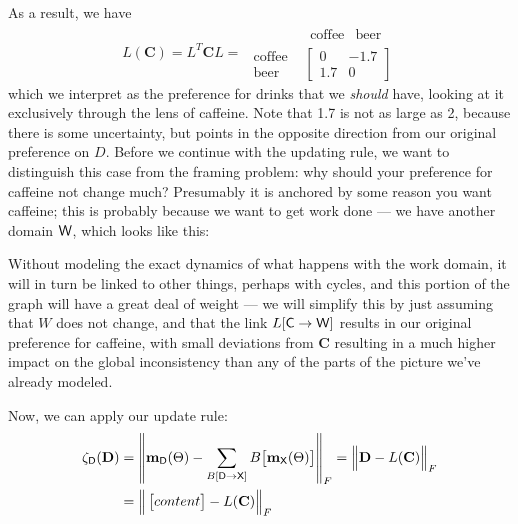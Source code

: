 \documentclass{article}
\theoremstyle{plain}
\theoremstyle{definition}
\theoremstyle{remark}
\newcommand\mat[1]{\mathbf #1}
\newcommand\m[1]{\mathbf m_{\mathsf #1}}
\begin{document}
	As a result, we have 
	\[ L(\mat C) = L^T \mat C L =\begin{matrix} & \begin{matrix}\text{coffee} & \text{beer}\end{matrix} \\[0.2em]
	\begin{matrix} \text{coffee} \\ \text{beer} \end{matrix} & \begin{bmatrix}
	0 & -1.7 \\ 1.7 & 0
	\end{bmatrix}\end{matrix} \]
	which we interpret as the preference for drinks that we \textit{should} have, looking at it exclusively through the lens of caffeine. Note that 1.7 is not as large as 2, because there is some uncertainty, but points in the opposite direction from our original preference on $D$. Before we continue with the updating rule, we want to distinguish this case from the framing problem: why should your preference for caffeine not change much? Presumably it is anchored by some reason you want caffeine; this is probably because we want to get work done --- we have another domain $\sf W$, which looks like this:\\
	
	
	\begin{center}
	\end{center}\vspace{1em}
	Without modeling the exact dynamics of what happens with the work domain, it will in turn be linked to other things, perhaps with cycles, and this portion of the graph will have a great deal of weight --- we will simplify this by just assuming that $W$ does not change, and that the link $L[{\sf C \to W}]$ results in our original preference for caffeine, with small deviations from $\mat C$ resulting in a much higher impact on the global inconsistency than any of the parts of the picture we've already modeled.
	
	Now, we can apply our update rule:
	\begin{align*}
		\zeta_{\sf D}(\mat D) &= \left\lVert \m D(\Theta)  - \sum_{B[\sf D \to X]} B\big[\m X(\Theta) \big] \right\rVert_F 
		= \Big\lVert \mat D  - L(\mat C) \Big\rVert_F \\
		&= \Big\lVert \begin{bmatrix}
		content
		\end{bmatrix}  - L(\mat C) \Big\rVert_F
	\end{align*}
\end{document}
